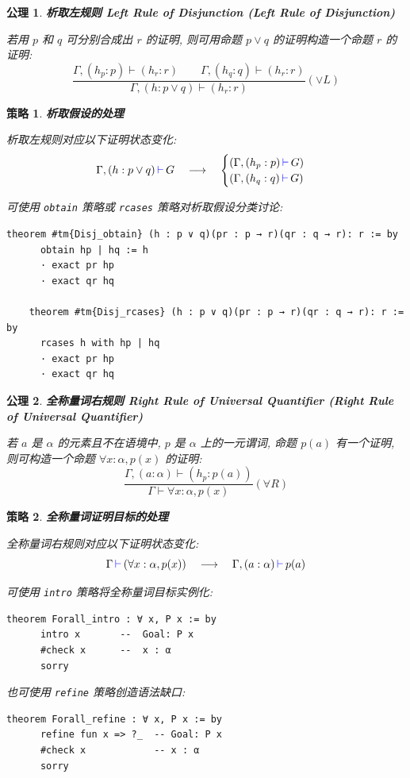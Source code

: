 \documentclass[UTF8]{ctexart}
\DeclareMathOperator{\0}{\mathbf{0}}                    %
\newcommand{\<}{\langle}
\renewcommand{\>}{\rangle}                              %
\newenvironment{thm_box}{
    \begin{tcolorbox}[enhanced, colback=thm_blue2, boxrule=0pt, frame hidden,
        borderline west={0.7mm}{0.1mm}{thm_blue1},breakable]
    }
    {\end{tcolorbox}}
\newenvironment{axm_box}{
    \begin{tcolorbox}[enhanced, colback=axm_yellow2, boxrule=0pt, frame hidden,
        borderline west={0.7mm}{0.1mm}{axm_yellow1},breakable]
    }
    {\end{tcolorbox}}
\theoremstyle{MyStyle} %
\newtheorem{axiom}{公理}[section]
\newenvironment{axm}[2]
{
    \begin{axm_box}
        \begin{axiom}
            \textbf{#1
                \ifx\relax#2\relax\else %
                    (#2) %
                \fi}
            \newline
}
{
        \end{axiom}
    \end{axm_box}
}
\newtheorem{mytactic}{策略}
\newenvironment{tactic}[1]
{
    \begin{thm_box}
        \begin{mytactic}
            \textbf{#1}
            \newline
}
{
        \end{mytactic}
    \end{thm_box}
}
\newcommand*{\lean}[1]{\texttt{\color{blue}#1}}
\newcommand{\Goal}{\texttt{\,\color{leanblue}\ensuremath{\vdash}\,}}
\begin{document}
        \begin{axm}
            {析取左规则}
            {Left Rule of Disjunction}
            若用 $p$ 和 $q$ 可分别合成出 $r$ 的证明, 则可用命题 $p\lor q$ 的证明构造一个命题 $r$ 的证明: 
            \[\frac{\Gamma, (h_p : p)\vdash(h_r : r)\qquad\Gamma, (h_q : q)\vdash(h_r : r)}{\Gamma, (h : p\lor q)\vdash(h_r : r)}(\lor L)\]


        \end{axm}

        \begin{tactic}
            {析取假设的处理}
            析取左规则对应以下证明状态变化: 
            \[\Gamma, (h : p\lor q)\Goal G\quad\longrightarrow\quad
            \begin{cases}
                (\Gamma, (h_p : p)\Goal G)\\
                (\Gamma, (h_q : q)\Goal G)
            \end{cases}\]
            
            可使用 \lean{obtain} 策略或 \lean{rcases} 策略对析取假设分类讨论: 
            \begin{lstlisting}[style=lean]
    theorem #tm{Disj_obtain} (h : p ∨ q)(pr : p → r)(qr : q → r): r := by
      obtain hp | hq := h
      · exact pr hp
      · exact qr hq

    theorem #tm{Disj_rcases} (h : p ∨ q)(pr : p → r)(qr : q → r): r := by
      rcases h with hp | hq
      · exact pr hp
      · exact qr hq
            \end{lstlisting}
        \end{tactic}

        \begin{axm}
            {全称量词右规则}
            {Right Rule of Universal Quantifier}
            若 $a$ 是 $\alpha$ 的元素且不在语境中, $p$ 是 $\alpha$ 上的一元谓词, 命题 $p(a)$ 有一个证明, 则可构造一个命题 $\forall x : \alpha, p(x)$ 的证明: 
            \[\frac{\Gamma, (a : \alpha)\vdash(h_p : p(a))}{\Gamma\vdash\forall x : \alpha, p(x)}(\forall R)\]
        \end{axm}

        \begin{tactic}
            {全称量词证明目标的处理}
            全称量词右规则对应以下证明状态变化: 
            \[\Gamma\Goal(\forall x : \alpha, p(x))\quad\longrightarrow\quad\Gamma, (a : \alpha)\Goal p(a)\]

            可使用 \lean{intro} 策略将全称量词目标实例化: 
            \begin{lstlisting}[style=lean]
    theorem Forall_intro : ∀ x, P x := by
      intro x       --  Goal: P x
      #check x      --  x : α
      sorry
            \end{lstlisting}
            
            也可使用 \lean{refine} 策略创造语法缺口: 
            \begin{lstlisting}[style=lean]
    theorem Forall_refine : ∀ x, P x := by
      refine fun x => ?_  -- Goal: P x
      #check x            -- x : α
      sorry
            \end{lstlisting}
        \end{tactic}
\end{document}
